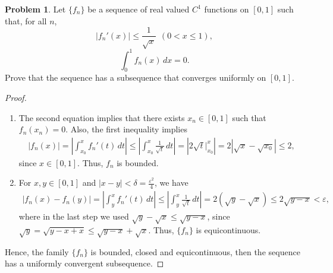 \documentclass[11pt]{article}
\theoremstyle{definition}
\newtheorem{problem}{Problem}
\theoremstyle{definition}
\begin{document}
\begin{problem}
Let  $\{f_n\}$ be a sequence of real valued $C^1$ functions on
$[0,1]$ such that, for all $n$,
$$
|f_n'(x)| \leq \frac{1}{\sqrt{x}}
\ \ (0<x\leq 1),
$$
$$
\int_0^1 f_n(x)\, dx = 0.
$$
Prove that the sequence has a subsequence that converges
uniformly on $[0,1]$.
\end{problem}
\begin{proof}
~\begin{enumerate}[label=(\alph*)]
    \item The second equation implies that there exists $x_n \in [0,1]$ such that $f_n(x_n) = 0$. Also, the first inequality implies
    \begin{align*}
        \left|f_n(x)\right| = \left|\int^{x}_{x_0} f_n'(t)\, dt\right| \leq \left|\int^{x}_{x_0} \frac{1}{\sqrt{t}}\, dt\right| = \left|2\sqrt{t} \Big|^{x}_{x_0} \right| = 2 \left|\sqrt{x} - \sqrt{x_0} \right| \leq 2,
    \end{align*}
    since $x\in [0,1]$. Thus, $f_n$ is bounded. 
    
    \item For $x,y\in [0,1]$ and $|x - y| < \delta = \frac{\varepsilon^2}{4}$, we have 
    \begin{align*}
        \left|f_n(x) - f_n(y)\right| = \left|\int^{x}_{y} f_n'(t)\, dt\right| \leq \left|\int^{x}_{y} \frac{1}{\sqrt{t}}\, dt\right| = 2 \left(\sqrt{y} - \sqrt{x}\right) \leq 2 \sqrt{y - x} < \varepsilon,
    \end{align*}
    where in the last step we used $\sqrt{y} - \sqrt{x} \leq \sqrt{y - x}$, since $\sqrt{y} = \sqrt{y-x+x} \leq \sqrt{y-x} + \sqrt{x}$. Thus, $\{f_n\}$ is equicontinuous.
\end{enumerate}
Hence, the family $\{f_n\}$ is bounded, closed and equicontinuous, then the sequence has a uniformly convergent subsequence.
\end{proof}

\medskip
\end{document}
